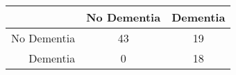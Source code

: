 \begin{table}[ht]
\centering
\begin{tabular}{r|c|c}
  \hline
 & No Dementia & Dementia \\ 
  \hline
No Dementia & 43 & 19 \\ 
  Dementia & 0 & 18 \\ 
   \hline
\end{tabular}
\end{table}

